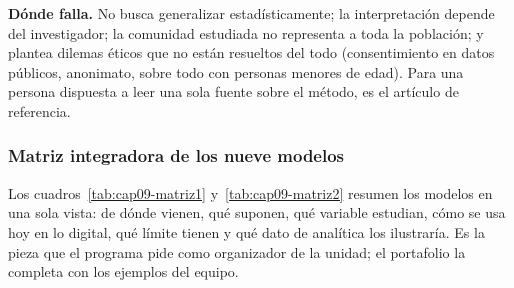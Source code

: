\textbf{Dónde falla.} No busca generalizar estadísticamente; la interpretación
depende del investigador; la comunidad estudiada no representa a toda la
población; y plantea dilemas éticos que no están resueltos del todo (consentimiento
en datos públicos, anonimato, sobre todo con personas menores de edad). Para una persona
dispuesta a leer una sola fuente sobre el método, \textcite{kozinets2002}
es el artículo de referencia. 

\subsubsection{Matriz integradora de los nueve modelos}

Los cuadros~\ref{tab:cap09-matriz1} y~\ref{tab:cap09-matriz2} resumen los modelos
en una sola vista: de dónde vienen, qué suponen, qué variable estudian, cómo se
usa hoy en lo digital, qué límite tienen y qué dato de analítica los
ilustraría. Es la pieza que el programa pide como organizador de la
unidad; el portafolio la completa con los ejemplos del equipo.

